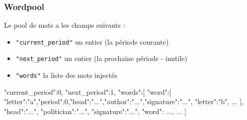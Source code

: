 \documentclass{article}
\begin{document}
 \subsubsection{Wordpool}
 \label{sec:wordpool}
 Le pool de mots a les champs suivants :
 \begin{itemize}
 \item \texttt{"current\_period"} un entier (la période courante)
 \item  \texttt{"next\_period"} un entier (la prochaine période - inutile)
 \item  \texttt{"words"} la liste des mots injectés
 \end{itemize}

\begin{jsonMessage}
   {"current_period":0, "next_period":1, "words":[
     { "word":[
       {"letter":"a","period":0,"head":"...","author":"...","signature":"..."},
       {"letter":"b", ...}  ], "head":"...", "politician":"...",
       "signature":"..."},
     { "word": ..., ...}  ] }
\end{jsonMessage}
\end{document}
